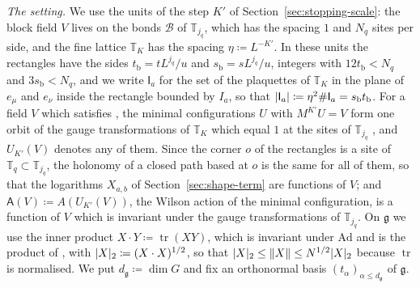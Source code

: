 \documentclass[11pt]{preprint}
\newcommand{\tr}{\operatorname{tr}}
\DeclarePairedDelimiter{\abs}{\lvert}{\rvert}
\DeclarePairedDelimiter{\norm}{\lVert}{\rVert}
\numberwithin{equation}{section}
\theoremstyle{definition}
\theoremstyle{remark}
\theoremstyle{plain}
\begin{document}
\emph{The setting.} We use the units of the step $K'$ of Section~\ref{sec:stopping-scale}: the block field $V$ lives on the bonds $\mathcal B$ of $\mathbb T_{j_q}$, which has the spacing $1$ and $N_q$ sites per side, and the fine lattice $\mathbb T_K$ has the spacing $\eta \coloneqq L^{-K'}$. In these units the rectangles have the sides $t_{\mathrm b} = tL^{j_q}/u$ and $s_{\mathrm b} = sL^{j_q}/u$, integers with $12t_{\mathrm b} < N_q$ and $3s_{\mathrm b} < N_q$, and we write $\mathsf I_a$ for the set of the plaquettes of $\mathbb T_K$ in the plane of $e_\mu$ and $e_\nu$ inside the rectangle bounded by $I_a$, so that $\abs{\mathsf I_a} \coloneqq \eta^2\#\mathsf I_a = s_{\mathrm b}t_{\mathrm b}$. For a field $V$ which satisfies \cite[(7), p.~278]{BalabanVAR}, the minimal configurations $U$ with $M^{K'}U = V$ form one orbit of the gauge transformations of $\mathbb T_K$ which equal $1$ at the sites of $\mathbb T_{j_q}$ \cite[(4), p.~278; Theorem~1, p.~279]{BalabanVAR}, and $U_{K'}(V)$ denotes any of them. Since the corner $o$ of the rectangles is a site of $\mathbb T_q \subset \mathbb T_{j_q}$, the holonomy of a closed path based at $o$ is the same for all of them, so that the logarithms $X_{a,b}$ of Section~\ref{sec:shape-term} are functions of $V$; and $\mathsf A(V) \coloneqq A(U_{K'}(V))$, the Wilson action of the minimal configuration, is a function of $V$ which is invariant under the gauge transformations of $\mathbb T_{j_q}$. On $\mathfrak g$ we use the inner product $X \cdot Y \coloneqq \tr(XY)$, which is invariant under $\mathrm{Ad}$ and is the product of \cite[p.~392]{BalabanPBG}, with $\abs X_2 \coloneqq (X \cdot X)^{1/2}$, so that $\abs X_2 \leq \norm X \leq N^{1/2}\abs X_2$ because $\tr$ is normalised. We put $d_{\mathfrak g} \coloneqq \dim G$ and fix an orthonormal basis $(t_\alpha)_{\alpha \leq d_{\mathfrak g}}$ of $\mathfrak g$.
\end{document}
